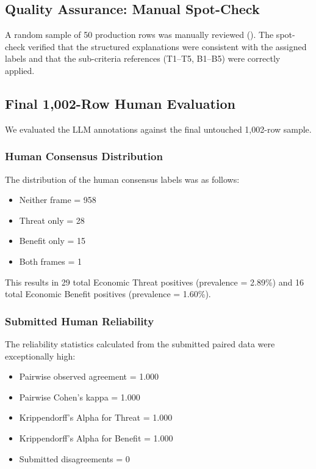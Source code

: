 \subsection{Quality Assurance: Manual Spot-Check}

A random sample of 50 production rows was manually reviewed (). The spot-check verified that the structured explanations were consistent with the assigned labels and that the sub-criteria references (T1--T5, B1--B5) were correctly applied.

\subsection{Final 1,002-Row Human Evaluation}
\label{sec:final_1002_human_evaluation}

We evaluated the LLM annotations against the final untouched 1,002-row sample.

\subsubsection{Human Consensus Distribution}
The distribution of the human consensus labels was as follows:
\begin{itemize}
    \item Neither frame = 958
    \item Threat only = 28
    \item Benefit only = 15
    \item Both frames = 1
\end{itemize}
This results in 29 total Economic Threat positives (prevalence = 2.89\%) and 16 total Economic Benefit positives (prevalence = 1.60\%).

\subsubsection{Submitted Human Reliability}
The reliability statistics calculated from the submitted paired data were exceptionally high:
\begin{itemize}
    \item Pairwise observed agreement = 1.000
    \item Pairwise Cohen's kappa = 1.000
    \item Krippendorff's Alpha for Threat = 1.000
    \item Krippendorff's Alpha for Benefit = 1.000
    \item Submitted disagreements = 0
\end{itemize}

